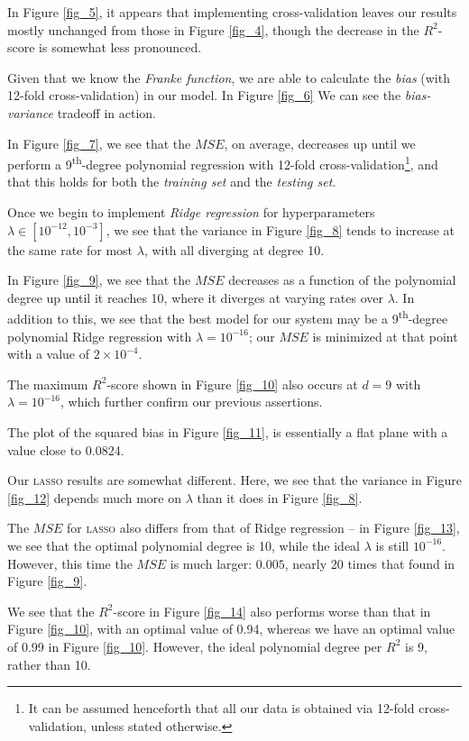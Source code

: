 \documentclass[a4paper,10pt,english]{article}
\begin{document}
In Figure \ref{fig_5}, it appears that implementing cross-validation leaves our results mostly unchanged from those in Figure \ref{fig_4}, though the decrease in the $R^2$-score is somewhat less pronounced.

Given that we know the \textit{Franke function}, we are able to calculate the \textit{bias} (with 12-fold cross-validation) in our model.  In Figure \ref{fig_6} We can see the \textit{bias-variance} tradeoff in action.  

In Figure \ref{fig_7}, we see that the $MSE$, on average, decreases up until we perform a 9\textsuperscript{th}-degree polynomial regression with 12-fold cross-validation\footnote{It can be assumed henceforth that all our data is obtained via 12-fold cross-validation, unless stated otherwise.}, and that this holds for both the \textit{training set} and the \textit{testing set}.

Once we begin to implement \textit{Ridge regression} for hyperparameters $\lambda \in [10^{-12}, 10^{-3}]$, we see that the variance in Figure \ref{fig_8} tends to increase at the same rate for most $\lambda$, with all diverging at degree 10.

In Figure \ref{fig_9}, we see that the $MSE$ decreases as a function of the polynomial degree up until it reaches 10, where it diverges at varying rates over $\lambda$.  In addition to this, we see that the best model for our system may be a 9\textsuperscript{th}-degree polynomial Ridge regression with $\lambda = 10^{-16}$; our $MSE$ is minimized at that point with a value of $2 \times 10^{-4}$.

The maximum $R^2$-score shown in Figure \ref{fig_10} also occurs at $d = 9$ with $\lambda = 10^{-16}$, which further confirm our previous assertions.

The plot of the squared bias in Figure \ref{fig_11}, is essentially a flat plane with a value close to 0.0824.  

Our \textsc{lasso} results are somewhat different.  Here, we see that the variance in Figure \ref{fig_12} depends much more on $\lambda$ than it does in Figure \ref{fig_8}.

The $MSE$ for \textsc{lasso} also differs from that of Ridge regression – in Figure \ref{fig_13}, we see that the optimal polynomial degree is 10, while the ideal $\lambda$ is still $10^{-16}$.
However, this time the $MSE$ is much larger: $0.005$, nearly 20 times that found in Figure \ref{fig_9}.

We see that the $R^2$-score in Figure \ref{fig_14} also performs worse than that in Figure \ref{fig_10}, with an optimal value of 0.94, whereas we have an optimal value of 0.99 in Figure \ref{fig_10}.  However, the ideal polynomial degree per $R^2$ is 9, rather than 10.
\end{document}
